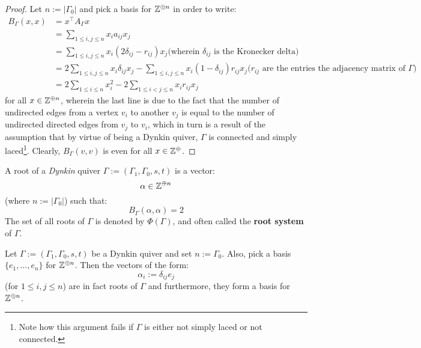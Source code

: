                 \begin{proof}
                    Let $n := |\Gamma_0|$ and pick a basis for $\mathbb{Z}^{\oplus n}$ in order to write:
                        $$
                            \begin{aligned}
                                B_{\Gamma}(x, x) & = x^{\top} A_{\Gamma} x
                                \\
                                & = \sum_{1 \leq i, j \leq n} x_i a_{ij} x_j
                                \\
                                & = \sum_{1 \leq i, j \leq n} x_i (2\delta_{ij} - r_{ij}) x_j \text{(wherein $\delta_{ij}$ is the Kronecker delta)}
                                \\
                                & = 2\sum_{1 \leq i, j \leq n} x_i \delta_{ij} x_j - \sum_{1 \leq i, j \leq n} x_i (1 - \delta_{ij}) r_{ij} x_j \text{($r_{ij}$ are the entries the adjacency matrix of $\Gamma$)}
                                \\
                                & = 2\sum_{1 \leq i \leq n} x_i^2 - 2\sum_{1 \leq i < j \leq n} x_i r_{ij} x_j
                            \end{aligned}
                        $$
                    for all $x \in \mathbb{Z}^{\oplus n}$, wherein the last line is due to the fact that the number of undirected edges from a vertex $v_i$ to another $v_j$ is equal to the number of undirected directed edges from $v_j$ to $v_i$, which in turn is a result of the assumption that by virtue of being a Dynkin quiver, $\Gamma$ is connected and simply laced\footnote{Note how this argument fails if $\Gamma$ is either not simply laced or not connected.}. Clearly, $B_{\Gamma}(v, v)$ is even for all $x \in \mathbb{Z}^{\oplus}$.
                \end{proof}
            \begin{definition}[Roots] \label{def: roots_of_dynkin_quivers}
                A root of a \textit{Dynkin} quiver $\Gamma := (\Gamma_1, \Gamma_0, s, t)$ is a vector:
                    $$\alpha \in \mathbb{Z}^{\oplus n}$$
                (where $n := |\Gamma_0|$) such that:
                    $$B_{\Gamma}(\alpha, \alpha) = 2$$
                The set of all roots of $\Gamma$ is denoted by $\Phi(\Gamma)$, and often called the \textbf{root system} of $\Gamma$.
            \end{definition}
            \begin{example} \label{example: simple_roots}
                Let $\Gamma := (\Gamma_1, \Gamma_0, s, t)$ be a Dynkin quiver and set $n := \Gamma_0$. Also, pick a basis $\{e_1, ..., e_n\}$ for $\mathbb{Z}^{\oplus n}$. Then the vectors of the form:
                    $$\alpha_i := \delta_{ij} e_j$$
                (for $1 \leq i, j \leq n$) are in fact roots of $\Gamma$ and furthermore, they form a basis for $\mathbb{Z}^{\oplus n}$.
            \end{example}
